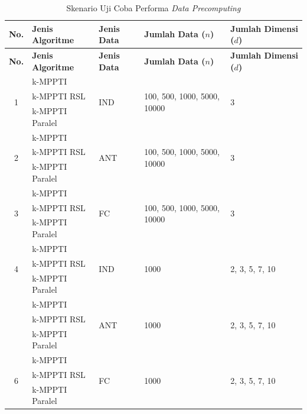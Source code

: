 \begin{longtable}{| c | p{3cm} | p{1cm} | p{2.5cm} | p{1.5cm} |}
	\caption{Skenario Uji Coba Performa \textit{Data Precomputing} \label{tab:uji-coba-performa-precompute}}\\
	\hline
	\textbf{No.} & \textbf{Jenis Algoritme} & \textbf{Jenis Data} & \textbf{Jumlah Data ($n$)} & \textbf{Jumlah Dimensi ($d$)} \\ \hline
	\endfirsthead
	\hline
	\textbf{No.} & \textbf{Jenis Algoritme} & \textbf{Jenis Data} & \textbf{Jumlah Data ($n$)} & \textbf{Jumlah Dimensi ($d$)} \\ \hline
	\endhead
	\multirow{3}{*}{1} & k-MPPTI & \multirow{3}{1cm}{IND} & \multirow{3}{2.5cm}{100, 500, 1000, 5000, 10000} & \multirow{3}{1.5cm}{3} \\ \cline{2-2} \nopagebreak
	& k-MPPTI RSL & & & \\ \cline{2-2} \nopagebreak
	& k-MPPTI Paralel & & & \\ \hline
	\multirow{3}{*}{2} & k-MPPTI & \multirow{3}{1cm}{ANT} & \multirow{3}{2.5cm}{100, 500, 1000, 5000, 10000} & \multirow{3}{1.5cm}{3}\\ \cline{2-2} \nopagebreak
	& k-MPPTI RSL & & & \\ \cline{2-2} \nopagebreak
	& k-MPPTI Paralel & & & \\ \hline
	\multirow{3}{*}{3} & k-MPPTI & \multirow{3}{1cm}{FC} & \multirow{3}{2.5cm}{100, 500, 1000, 5000, 10000} & \multirow{3}{1.5cm}{3}\\ \cline{2-2} \nopagebreak
	& k-MPPTI RSL & & & \\ \cline{2-2} \nopagebreak
	& k-MPPTI Paralel & & & \\ \hline 
	\multirow{3}{*}{4} & k-MPPTI & \multirow{3}{1cm}{IND} & \multirow{3}{2.5cm}{1000} & \multirow{3}{1.5cm}{2, 3, 5, 7, 10}\\ \cline{2-2}	\nopagebreak	
	& k-MPPTI RSL & & & \\ \cline{2-2} \nopagebreak
	& k-MPPTI Paralel & & & \\ \hline \pagebreak
	\multirow{3}{*}{5} & k-MPPTI & \multirow{3}{1cm}{ANT} & \multirow{3}{2.5cm}{1000} & \multirow{3}{1.5cm}{2, 3, 5, 7, 10}\\ \cline{2-2}\nopagebreak
	& k-MPPTI RSL & & & \\ \cline{2-2} \nopagebreak
	& k-MPPTI Paralel & & & \\ \hline 
	\multirow{3}{*}{6} & k-MPPTI & \multirow{3}{1cm}{FC} & \multirow{3}{2.5cm}{1000} & \multirow{3}{1.5cm}{2, 3, 5, 7, 10}\\ \cline{2-2} \nopagebreak
	& k-MPPTI RSL & & & \\ \cline{2-2} \nopagebreak
	& k-MPPTI Paralel & & & \\ \hline
\end{longtable}

